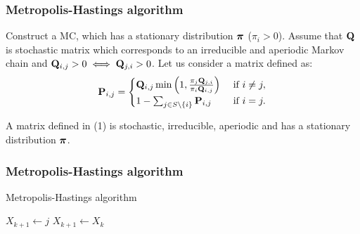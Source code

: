 \begin{frame}
	\frametitle{Metropolis-Hastings algorithm}
	Construct a MC, which has a stationary distribution $\boldsymbol{\pi}$ ($\pi_i > 0$).
	Assume that $\mathbf{Q}$ is stochastic matrix which corresponds to an irreducible and aperiodic Markov chain and $\mathbf{Q}_{i,j} >0 \iff \mathbf{Q}_{j,i} > 0$. Let us consider a matrix defined as:
	\begin{equation} \label{eq:PQ}
	\mathbf{P}_{i,j} = 
	\begin{cases}
	\mathbf{Q}_{i,j} \min \left(1, \frac{\pi_j \mathbf{Q}_{j,i}}{\pi_i \mathbf{Q}_{i,j}}\right) & \text{ if } i \neq j, \\ 
	1 - \sum_{j \in S \setminus \left\{ i \right\} } \mathbf{P}_{i,j}& \text{ if } i = j.
	\end{cases}
	\end{equation} 
	
	\begin{theorem}
		A matrix defined in (1) is stochastic, irreducible, aperiodic and has a stationary distribution $\boldsymbol{\pi}$.
	\end{theorem}
\end{frame}

\begin{frame}
	\frametitle{Metropolis-Hastings algorithm}
	\begin{algorithm}[H]
		\caption{Metropolis-Hastings algorithm}\label{alg:metro-hast}
		\begin{algorithmic}[1]
			
			\State $X_{k+1} \gets j$
			\Else
			\State $X_{k+1} \gets X_k$
			\EndIf
			\EndFor
		\end{algorithmic}
	\end{algorithm}
\end{frame}